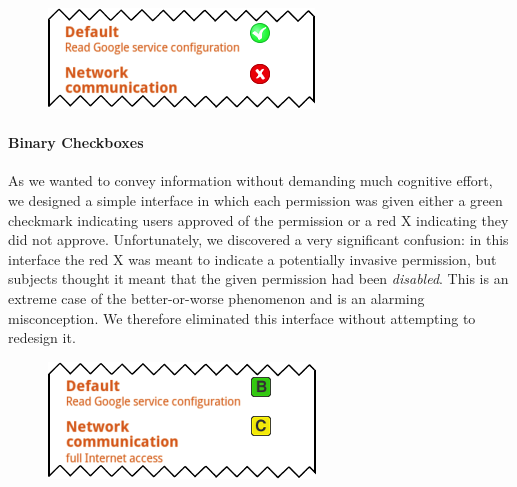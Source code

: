 \documentclass[11pt]{article}
\begin{document}
\begin{figure}
\begin{center}
\includegraphics[width=.9\linewidth]{candidate-img/checkboxes/checkboxesR1.png}
\end{center}
\end{figure}

\paragraph{Binary Checkboxes}
\label{s-sec-checkbox}

As we wanted to convey information without demanding much cognitive effort,
we designed a simple interface in which 
each permission was given either a green 
checkmark indicating users approved of the permission or a red X indicating 
they did not approve.
\label{ss-sec-binary-r1}
Unfortunately, we discovered a very significant confusion: in this interface
the red X was meant to indicate a potentially invasive permission, but 
subjects thought it meant that the given permission had been \emph{disabled}. This
is an extreme case of the better-or-worse phenomenon and is an 
alarming misconception. We therefore eliminated this interface without attempting to 
redesign it.


\begin{figure}
\begin{center}
\includegraphics[width=.9\linewidth]{candidate-img/grades/gradesR1.png}
\end{center}
\end{figure}
\end{document}
